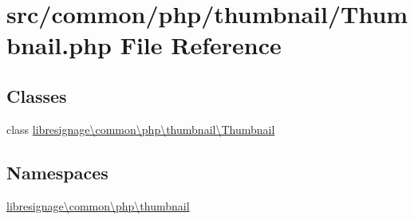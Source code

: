 \hypertarget{Thumbnail_8php}{}\section{src/common/php/thumbnail/\+Thumbnail.php File Reference}
\label{Thumbnail_8php}
\subsection*{Classes}
\begin{DoxyCompactItemize}
\item 
class \hyperlink{classlibresignage_1_1common_1_1php_1_1thumbnail_1_1Thumbnail}{libresignage\textbackslash{}common\textbackslash{}php\textbackslash{}thumbnail\textbackslash{}\+Thumbnail}
\end{DoxyCompactItemize}
\subsection*{Namespaces}
\begin{DoxyCompactItemize}
\item 
 \hyperlink{namespacelibresignage_1_1common_1_1php_1_1thumbnail}{libresignage\textbackslash{}common\textbackslash{}php\textbackslash{}thumbnail}
\end{DoxyCompactItemize}
